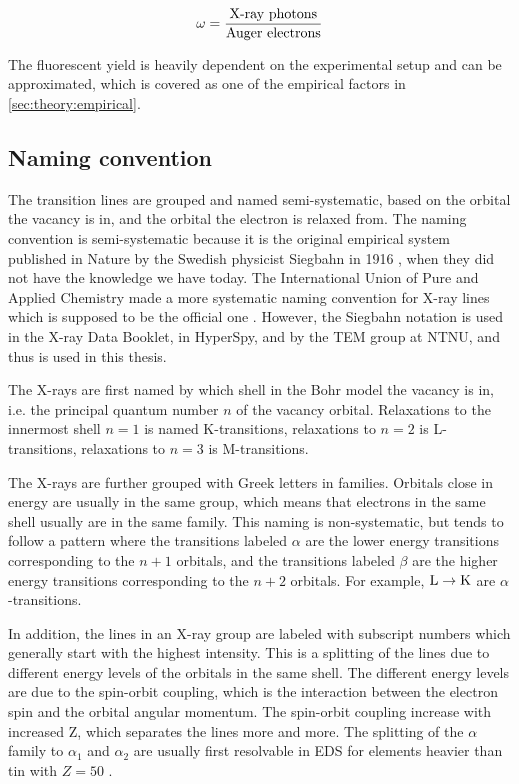 \begin{equation}
    \label{eq:theory:theoreticalxray:yield}
    \omega = \frac{\textnormal{X-ray photons}}{\textnormal{Auger electrons}}
\end{equation}


The fluorescent yield is heavily dependent on the experimental setup and can be approximated, which is covered as one of the empirical factors in \cref{sec:theory:empirical}.


%
%
\subsection{Naming convention}
\label{sec:theory:theoreticalxray:naming}

The transition lines are grouped and named semi-systematic, based on the orbital the vacancy is in, and the orbital the electron is relaxed from.
The naming convention is semi-systematic because it is the original empirical system published in Nature by the Swedish physicist Siegbahn in 1916 \cite{siegbahn_relations_1916}, when they did not have the knowledge we have today.
The International Union of Pure and Applied Chemistry made a more systematic naming convention for X-ray lines which is supposed to be the official one \cite[Ch. 4.2.4]{goldstein_scanning_2018}.
However, the Siegbahn notation is used in the X-ray Data Booklet, in HyperSpy, and by the TEM group at NTNU, and thus is used in this thesis.

The X-rays are first named by which shell in the Bohr model the vacancy is in, i.e. the principal quantum number $n$ of the vacancy orbital.
Relaxations to the innermost shell $n=1$ is named K-transitions, relaxations to $n=2$ is L-transitions, relaxations to $n=3$ is M-transitions.

The X-rays are further grouped with Greek letters in families. %
Orbitals close in energy are usually in the same group, which means that electrons in the same shell usually are in the same family.
This naming is non-systematic, but tends to follow a pattern where the transitions labeled $\alpha$ are the lower energy transitions corresponding to the $n+1$ orbitals, and the transitions labeled $\beta$ are the higher energy transitions corresponding to the $n+2$ orbitals.
For example, $\textnormal{L} \rightarrow \textnormal{K}$ are $\alpha$-transitions.

In addition, the lines in an X-ray group are labeled with subscript numbers which generally start with the highest intensity. %
This is a splitting of the lines due to different energy levels of the orbitals in the same shell.
The different energy levels are due to the spin-orbit coupling, which is the interaction between the electron spin and the orbital angular momentum.
The spin-orbit coupling increase with increased Z, which separates the lines more and more.
The splitting of the $\alpha$ family to $\alpha_1$ and $\alpha_2$ are usually first resolvable in EDS for elements heavier than tin with $ Z = 50$ \cite[Ch. 8.2.2.3]{hollas_modern_2004}. %

